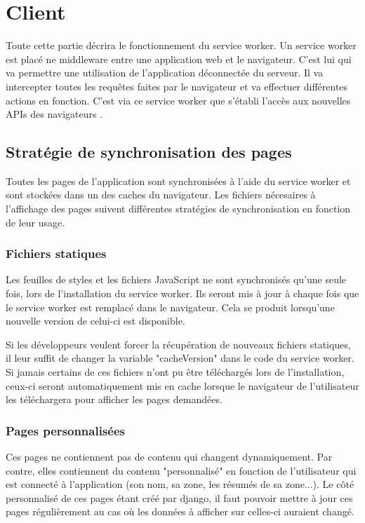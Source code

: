 \documentclass{EPL-master-thesis-covers-FR}
\begin{document}
				
		\section{Client}
			Toute cette partie décrira le fonctionnement du service worker. Un service worker est placé ne middleware entre une application web et le navigateur. C'est lui qui va permettre une utilisation de l'application déconnectée du serveur. Il va intercepter toutes les requêtes faites par le navigateur et va effectuer différentes actions en fonction. C'est via ce service worker que s'établi l'accès aux nouvelles APIs des navigateurs \cite{ref:sw}.
			
			
			\subsection{Stratégie de synchronisation des pages}			
				Toutes les pages de l'application sont synchronisées à l'aide du service worker et sont stockées dans un des caches du navigateur. Les fichiers nécesaires à l'affichage des pages suivent différentes stratégies de synchronisation en fonction de leur usage.			
				
				\subsubsection*{Fichiers statiques}  
					Les feuilles de styles et les fichiers JavaScript ne sont synchronisés qu'une seule fois, lors de l'installation du service worker. Ils seront mis à jour à chaque fois que le service worker est remplacé dans le navigateur. Cela se produit lorsqu'une nouvelle version de celui-ci est disponible. 
					
					Si les développeurs veulent forcer la récupération de nouveaux fichiers statiques, il leur suffit de changer la variable "cacheVersion" dans le code du service worker. Si jamais certains de ces fichiers n'ont pu être téléchargés lors de l'installation, ceux-ci seront automatiquement mis en cache lorsque le navigateur de l'utilisateur les téléchargera pour afficher les pages demandées.
					
					
				\subsubsection*{Pages personnalisées}				
				 	Ces pages ne contiennent pas de contenu qui changent dynamiquement. Par contre, elles contiennent du contenu "personnalisé" en fonction de l'utilisateur qui est connecté à l'application (son nom, sa zone, les résumés de sa zone...). Le côté personnalisé de ces pages étant créé par \Gls{django}, il faut pouvoir mettre à jour ces pages régulièrement au cas où les données à afficher sur celles-ci auraient changé. 
				 	
\end{document}

